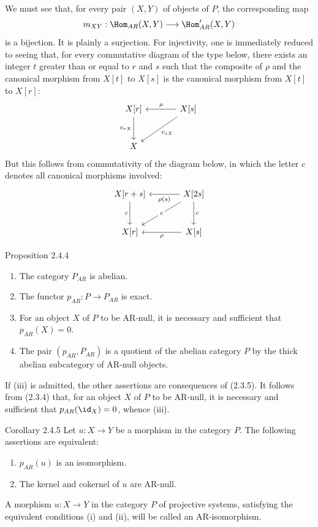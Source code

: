 \begin{prooftext}[Proof]
We must see that, for every pair $(X,Y)$ of objects of $P$, the corresponding map
\[
m_{XY}:\Hom_{AR}(X,Y)\longrightarrow\Hom'_{AR}(X,Y)
\]
is a bijection. It is plainly a surjection. For injectivity, one is immediately reduced to seeing that, for every commutative diagram of the type below, there exists an integer $t$ greater than or equal to $r$ and $s$ such that the composite of $\rho$ and the canonical morphism from $X[t]$ to $X[s]$ is the canonical morphism from $X[t]$ to $X[r]$:
\[
\begin{tikzcd}[column sep=large,row sep=large]
X[r] \arrow[d,"{v_{rX}}"'] & X[s] \arrow[l,"\rho"'] \arrow[dl,"{v_{sX}}"]\\
X & {}
\end{tikzcd}
\]
But this follows from commutativity of the diagram below, in which the letter $c$ denotes all canonical morphisms involved:
\[
\begin{tikzcd}[column sep=large,row sep=large]
X[r+s] \arrow[d,"c"'] & X[2s] \arrow[l,"\rho(s)"] \arrow[d,"c"] \arrow[dl,"c" description]\\
X[r] & X[s] \arrow[l,"\rho"]
\end{tikzcd}
\]
\end{prooftext}

\begin{statement}{Proposition 2.4.4}
\begin{enumerate}[label=(\roman*)]
\item The category $P_{AR}$ is abelian.
\item The functor $p_{AR}:P\to P_{AR}$ is exact.
\item For an object $X$ of $P$ to be AR-null, it is necessary and sufficient that $p_{AR}(X)=0$.
\item The pair $(p_{AR},P_{AR})$ is a quotient of the abelian category $P$ by the thick abelian subcategory of AR-null objects.
\end{enumerate}
\end{statement}

\begin{prooftext}[Proof]
If (iii) is admitted, the other assertions are consequences of (2.3.5). It follows from (2.3.4) that, for an object $X$ of $P$ to be AR-null, it is necessary and sufficient that $p_{AR}(\id_X)=0$, whence (iii).
\end{prooftext}

\begin{statement}{Corollary 2.4.5}
Let $u:X\to Y$ be a morphism in the category $P$. The following assertions are equivalent:
\begin{enumerate}[label=(\roman*)]
\item $p_{AR}(u)$ is an isomorphism.
\item The kernel and cokernel of $u$ are AR-null.
\end{enumerate}
A morphism $u:X\to Y$ in the category $P$ of projective systems, satisfying the equivalent conditions (i) and (ii), will be called an AR-isomorphism.
\end{statement}


